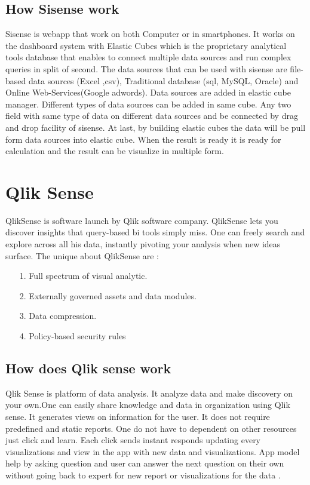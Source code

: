 \subsection{How Sisense work}
Sisense is webapp that work on  both Computer or in smartphones. It works on the dashboard system with Elastic Cubes which is the proprietary analytical tools database that enables to connect multiple data sources and run complex queries in split of second. The data sources that can be used with sisense are file-based data sources (Excel ,\acs{csv}), Traditional database (\acs{sql}, MySQL, Oracle) and Online Web-Services(Google adwords). Data sources are added in elastic cube manager.
 Different  types of data sources can be added in same cube. Any two field with same type of data on different data sources and be connected by drag and  drop facility of sisense. At last, by building elastic cubes the data will be pull form data sources into elastic cube. When the result is ready it is ready for calculation and the result can be visualize in multiple form.
\newpage

\section{Qlik Sense}
QlikSense is software launch  by Qlik software company. QlikSense lets you discover insights that query-based \ac{bi} tools simply miss. One can freely search and explore across  all his data, instantly pivoting your analysis when new ideas surface.\cite{troyansky2015qlikview}
\linebreak
The  unique about QlikSense are :

\begin{enumerate}
\item[1.] Full spectrum of visual analytic.
\item[2.] Externally governed assets and data modules.
\item[3.] Data compression.
\item[4.] Policy-based security rules
\end{enumerate}
\par
\subsection{How does Qlik sense work}
Qlik Sense is platform of data analysis. It analyze data and make discovery on your own.One can easily share knowledge and data in organization using Qlik sense. It generates views on information for the user. It does not require predefined and static reports. One do not have to dependent on other resources just click and learn. Each click sends instant responds updating every visualizations and view in the app with new data and visualizations. App model help by asking question and user can answer the next question on their own without going back to expert for new report or visualizations for the data .
